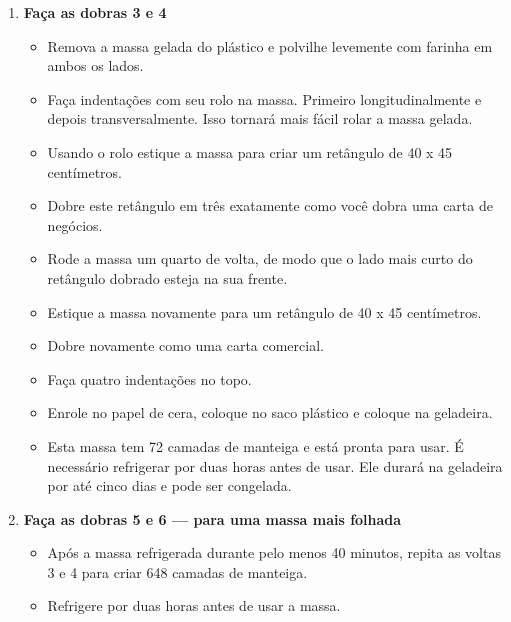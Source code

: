 \documentclass [11pt, letterpaper] {article}
\begin{document}
\begin {description}
\begin {enumerate}
\item {\bf Faça as dobras 3 e 4}
\begin {itemize}
\item Remova a massa gelada do pl\'astico e polvilhe levemente com farinha em ambos os lados.
\item Faça indentações com seu rolo na massa. Primeiro longitudinalmente e depois transversalmente. Isso tornará mais fácil rolar a massa gelada.
\item Usando o rolo estique a massa para criar um retângulo de 40 x 45 cent\'imetros.
\item Dobre este retângulo em três exatamente como você dobra uma carta de negócios.
\item Rode a massa um quarto de volta, de modo que o lado mais curto do retângulo dobrado esteja na sua frente.
\item Estique a massa novamente para um retângulo de 40 x 45 cent\'imetros.
\item Dobre novamente como uma carta comercial.
\item Faça quatro indentações no topo.
\item Enrole no papel de cera, coloque no saco plástico e coloque na geladeira.
\item Esta massa tem 72 camadas de manteiga e está pronta para usar. É necessário refrigerar por duas horas antes de usar. Ele durará na geladeira por até cinco dias e pode ser congelada.
\end {itemize}
\item {\bf Faça as dobras 5 e 6 --- para uma massa mais folhada}
\begin {itemize}
\item Após a massa refrigerada durante pelo menos 40 minutos, repita as voltas 3 e 4 para criar 648 camadas de manteiga.
\item Refrigere por duas horas antes de usar a massa.
\end {itemize}
\end {enumerate}
\end {description}
\end{document}
